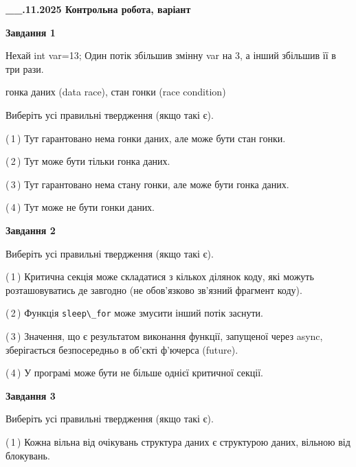 \documentclass[12pt, ukrainian]{article}
\def\code#1{\Verb!#1!}
\begin{document}
\begin {large}

\textbf{\_\_.11.2025 Контрольна робота, варіант  }\par


{

\begin{center}
\textbf{Завдання 1}
\end{center}
Нехай int var=13; Один потік збільшив змінну var на 3, а інший збільшив її в три рази.

гонка даних (data race), стан гонки (race condition)

Виберіть усі правильні твердження (якщо такі є).\par
\vspace{2mm}
(\,1\,) Тут гарантовано нема гонки даних, але може бути стан гонки.%

(\,2\,) Тут може бути тільки гонка даних.%

(\,3\,) Тут гарантовано нема стану гонки, але може бути гонка даних.%

(\,4\,) Тут може не бути гонки даних.%



\begin{center}
\textbf{Завдання 2}
\end{center}
Виберіть усі правильні твердження (якщо такі є).\par
\vspace{2mm}

(\,1\,) Критична секція може складатися з кількох ділянок коду, які можуть розташовуватись де завгодно (не обов’язково зв’язний фрагмент коду).%

(\,2\,) Функція \code{sleep\_for} може змусити інший потік заснути.%

(\,3\,) Значення, що є результатом виконання функції, запущеної через async, зберігається безпосередньо в об’єкті ф’ючерса (future).%

(\,4\,) У програмі може бути не більше однієї критичної секції.%



\begin{center}
\textbf{Завдання 3}
\end{center}
Виберіть усі правильні твердження (якщо такі є).\par
\vspace{2mm}

(\,1\,) Кожна вільна від очікувань структура даних є структурою даних, вільною від блокувань.%

}
\end{large}
\end{document}
